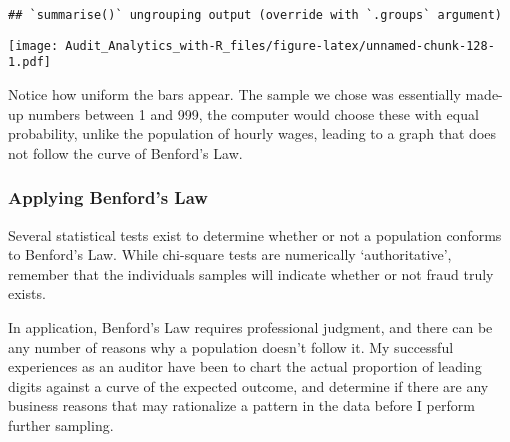 \documentclass[
]{book}
\newenvironment{Shaded}{\begin{snugshade}}{\end{snugshade}}
\newcommand{\DataTypeTok}[1]{\textcolor[rgb]{0.13,0.29,0.53}{#1}}
\newcommand{\DecValTok}[1]{\textcolor[rgb]{0.00,0.00,0.81}{#1}}
\newcommand{\KeywordTok}[1]{\textcolor[rgb]{0.13,0.29,0.53}{\textbf{#1}}}
\newcommand{\NormalTok}[1]{#1}
\newcommand{\OperatorTok}[1]{\textcolor[rgb]{0.81,0.36,0.00}{\textbf{#1}}}
\newcommand{\OtherTok}[1]{\textcolor[rgb]{0.56,0.35,0.01}{#1}}
\newcommand{\StringTok}[1]{\textcolor[rgb]{0.31,0.60,0.02}{#1}}
\begin{document}
\begin{Shaded}
\end{Shaded}

\begin{verbatim}
## `summarise()` ungrouping output (override with `.groups` argument)
\end{verbatim}

\texttt{[image: Audit\_Analytics\_with-R\_files/figure-latex/unnamed-chunk-128-1.pdf]}

Notice how uniform the bars appear. The sample we chose was essentially made-up numbers between 1 and 999, the computer would choose these with equal probability, unlike the population of hourly wages, leading to a graph that does not follow the curve of Benford's Law.

\hypertarget{applying-benfords-law}{%
\subsubsection{Applying Benford's Law}\label{applying-benfords-law}}

Several statistical tests exist to determine whether or not a population conforms to Benford's Law. While chi-square tests are numerically `authoritative', remember that the individuals samples will indicate whether or not fraud truly exists.

In application, Benford's Law requires professional judgment, and there can be any number of reasons why a population doesn't follow it. My successful experiences as an auditor have been to chart the actual proportion of leading digits against a curve of the expected outcome, and determine if there are any business reasons that may rationalize a pattern in the data before I perform further sampling.
\end{document}
